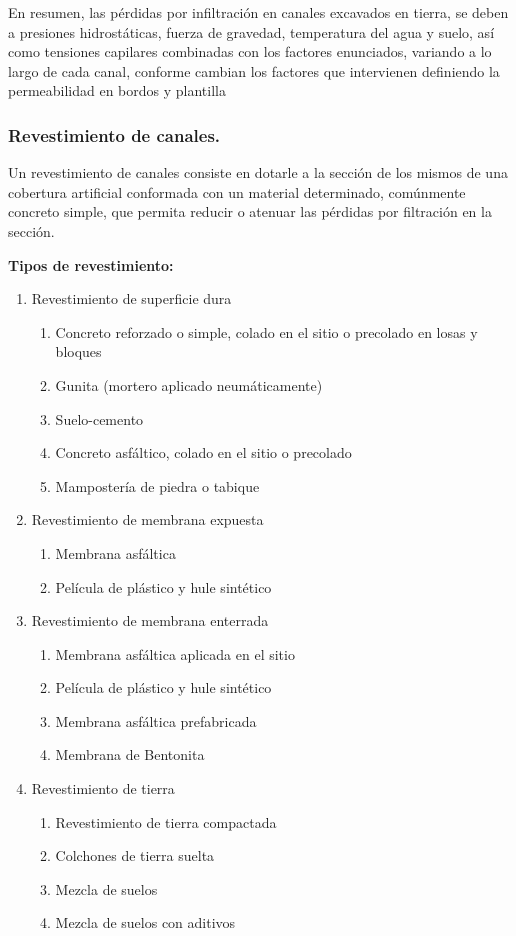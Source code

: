 En resumen, las pérdidas por infiltración en canales excavados en tierra, se
deben a presiones hidrostáticas, fuerza de gravedad, temperatura del agua y suelo, así
como tensiones capilares combinadas con los factores enunciados, variando a lo largo
de cada canal, conforme cambian los factores que intervienen definiendo la
permeabilidad en bordos y plantilla

\subsubsection{Revestimiento de canales.}
Un revestimiento de canales consiste en dotarle a la sección de los mismos de
una cobertura artificial conformada con un material determinado, comúnmente concreto
simple, que permita reducir o atenuar las pérdidas por filtración en la sección.

\textbf{Tipos de revestimiento:}

\begin{enumerate}
	\item Revestimiento de superficie dura
	      \begin{enumerate}
		      \item Concreto reforzado o simple, colado en el sitio o precolado en losas y bloques
		      \item Gunita (mortero aplicado neumáticamente)
		      \item Suelo-cemento
		      \item Concreto asfáltico, colado en el sitio o precolado
		      \item Mampostería de piedra o tabique
	      \end{enumerate}
	\item  Revestimiento de membrana expuesta
	      \begin{enumerate}
		      \item Membrana asfáltica
		      \item Película de plástico y hule sintético
	      \end{enumerate}
	\item  Revestimiento de membrana enterrada
	      \begin{enumerate}
		      \item Membrana asfáltica aplicada en el sitio
		      \item Película de plástico y hule sintético
		      \item Membrana asfáltica prefabricada
		      \item Membrana de Bentonita
	      \end{enumerate}
	\item  Revestimiento de tierra
	      \begin{enumerate}
		      \item Revestimiento de tierra compactada
		      \item Colchones de tierra suelta
		      \item Mezcla de suelos
		      \item Mezcla de suelos con aditivos
	      \end{enumerate}
\end{enumerate}

